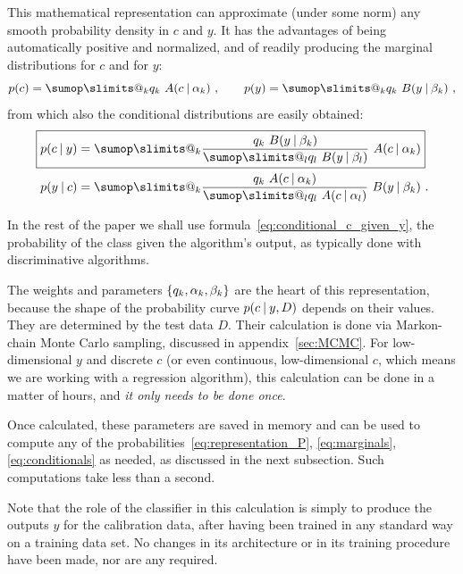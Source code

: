 \documentclass[\ifafour a4paper,12pt,\else a5paper,10pt,\fi%
onecolumn,oneside,article,%
british%
]{memoir}
\makeatletter
\theoremstyle{remark}
\theoremstyle{innote}
\def\sum{\DOTSI\sumop\slimits@}
\DeclarePairedDelimiter\set{\{}{\}} %
\renewcommand*{\|}[1][]{\nonscript\:#1\vert\nonscript\:\mathopen{}}
\makeatother
\begin{document}
This mathematical representation can approximate (under some norm) any smooth probability density in $c$ and $y$. It has the advantages of being automatically positive and normalized, and of readily producing the marginal distributions for $c$ and for $y$:
\begin{equation}
  \label{eq:marginals}
  p(c) = \sum_{k} q_{k}\ A(c \| \alpha_{k})\ ,
  \qquad
  p(y) = \sum_{k} q_{k}\ B(y \| \beta_{k}) \ ,
\end{equation}
from which also the conditional distributions are easily obtained:
\begin{subequations} \label{eq:conditionals}
  \begin{align}
    \label{eq:conditional_c_given_y}
  \Aboxed{  p(c \| y) &= \sum_{k} \frac{q_{k}\ B(y \| \beta_{k})
                }{\sum_{l} q_{l}\ B(y \| \beta_{l})}\
                A(c \| \alpha_{k})}
    \\
    \label{eq:conditional_y_given_c}
    p(y \| c) &= \sum_{k} \frac{q_{k}\ A(c \| \alpha_{k})
                }{\sum_{l} q_{l}\ A(c \| \alpha_{l})}\
                B(y \| \beta_{k}) \ .
  \end{align}
\end{subequations}

In the rest of the paper we shall use formula~\eqref{eq:conditional_c_given_y}, the probability of the class given the algorithm's output, as typically done with discriminative algorithms. 

\medskip

The weights and parameters $\set{q_{k}, \alpha_{k}, \beta_{k}}$ are the heart of this representation, because the shape of the probability curve $p(c \| y, D)$ depends on their values. They are determined by the test data $D$. Their calculation is done via Markon-chain Monte Carlo sampling, discussed in appendix~\ref{sec:MCMC}. For low-dimensional $y$ and discrete $c$ (or even continuous, low-dimensional $c$, which means we are working with a regression algorithm), this calculation can be done in a matter of hours, and \emph{it only needs to be done once}.

Once calculated, these parameters are saved in memory and can be used to compute any of the probabilities~\eqref{eq:representation_P}, \eqref{eq:marginals}, \eqref{eq:conditionals} as needed, as discussed in the next subsection. Such computations take less than a second.

Note that the role of the classifier in this calculation is simply to produce the outputs $y$ for the calibration data, after having been trained in any standard way on a training data set. No changes in its architecture or in its training procedure have been made, nor are any required.
\end{document}
